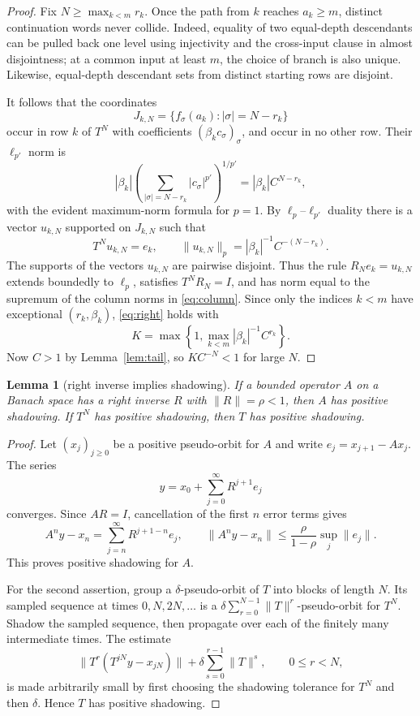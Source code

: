 \documentclass[11pt]{article}
\newtheorem{lemma}{Lemma}
\begin{document}
\begin{proof}
Fix $N\ge\max_{k<m}r_k$.  Once the path from $k$ reaches $a_k\ge m$, distinct
continuation words never collide.  Indeed, equality of two equal-depth
descendants can be pulled back one level using injectivity and the
cross-input clause in almost disjointness; at a common input at least $m$,
the choice of branch is also unique.  Likewise, equal-depth descendant sets
from distinct starting rows are disjoint.

It follows that the coordinates
\[
      J_{k,N}=\{f_\sigma(a_k):|\sigma|=N-r_k\}
\]
occur in row $k$ of $T^N$ with coefficients
$(\beta_kc_\sigma)_\sigma$, and occur in no other row.  Their $\ell_{p'}$
norm is
\[
       |\beta_k|
       \left(\sum_{|\sigma|=N-r_k}|c_\sigma|^{p'}\right)^{1/p'}
       =|\beta_k|C^{N-r_k},
\]
with the evident maximum-norm formula for $p=1$.  By $\ell_p$--$\ell_{p'}$
duality there is a vector $u_{k,N}$ supported on $J_{k,N}$ such that
\[
 T^Nu_{k,N}=e_k,
 \qquad
 \|u_{k,N}\|_p=|\beta_k|^{-1}C^{-(N-r_k)}.
\tag{4}\label{eq:column}
\]
The supports of the vectors $u_{k,N}$ are pairwise disjoint.  Thus the rule
$R_Ne_k=u_{k,N}$ extends boundedly to $\ell_p$, satisfies $T^NR_N=I$, and
has norm equal to the supremum of the column norms in \eqref{eq:column}.
Since only the indices $k<m$ have exceptional $(r_k,\beta_k)$, \eqref{eq:right}
holds with
\[
 K=\max\left\{1,\max_{k<m}|\beta_k|^{-1}C^{r_k}\right\}.
\]
Now $C>1$ by Lemma~\ref{lem:tail}, so $KC^{-N}<1$ for large $N$.
\end{proof}

\begin{lemma}[right inverse implies shadowing]\label{lem:shadow}
If a bounded operator $A$ on a Banach space has a right inverse $R$ with
$\|R\|=\rho<1$, then $A$ has positive shadowing.  If $T^N$ has positive
shadowing, then $T$ has positive shadowing.
\end{lemma}

\begin{proof}
Let $(x_j)_{j\ge0}$ be a positive pseudo-orbit for $A$ and write
$e_j=x_{j+1}-Ax_j$.  The series
\[
                y=x_0+\sum_{j=0}^\infty R^{j+1}e_j
\tag{5}\label{eq:shadowseries}
\]
converges.  Since $AR=I$, cancellation of the first $n$ error terms gives
\[
 A^ny-x_n=\sum_{j=n}^\infty R^{j+1-n}e_j,
 \qquad
 \|A^ny-x_n\|\le \frac{\rho}{1-\rho}\sup_j\|e_j\|.
\]
This proves positive shadowing for $A$.

For the second assertion, group a $\delta$-pseudo-orbit of $T$ into blocks of
length $N$.  Its sampled sequence at times $0,N,2N,\ldots$ is a
$\delta\sum_{r=0}^{N-1}\|T\|^r$-pseudo-orbit for $T^N$.  Shadow the sampled
sequence, then propagate over each of the finitely many intermediate times.
The estimate
\[
 \|T^r(T^{jN}y-x_{jN})\|
 +\delta\sum_{s=0}^{r-1}\|T\|^s,
 \qquad 0\le r<N,
\]
is made arbitrarily small by first choosing the shadowing tolerance for
$T^N$ and then $\delta$.  Hence $T$ has positive shadowing.
\end{proof}
\end{document}
